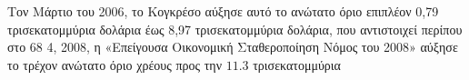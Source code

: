 \documentclass{article}
\newcommand{\gr}{\selectlanguage{greek}}
\begin{document}
\gr

Τον Μάρτιο του 2006, το Κογκρέσο αύξησε αυτό το ανώτατο όριο
επιπλέον 0,79 τρισεκατομμύρια δολάρια έως 8,97 τρισεκατομμύρια δολάρια,
που αντιστοιχεί περίπου στο 68%
4, 2008, η «Επείγουσα Οικονομική Σταθεροποίηση
Νόμος του 2008» αύξησε το τρέχον ανώτατο όριο χρέους
προς την $11.3$ τρισεκατομμύρια
\end{document}
